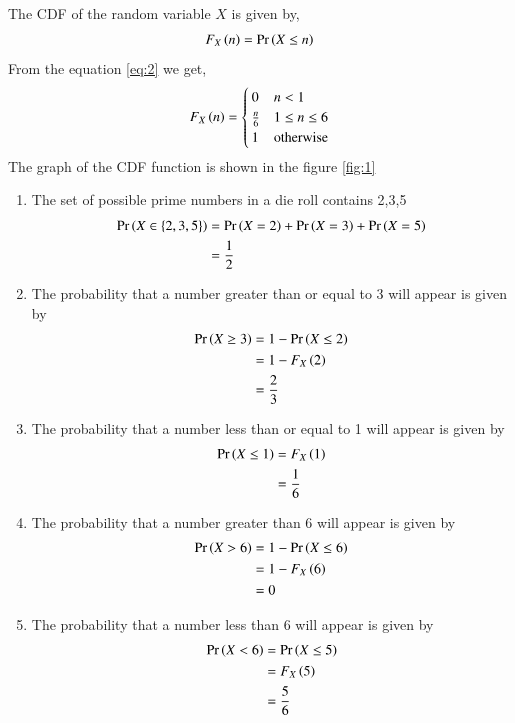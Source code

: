 \documentclass[journal,12pt,twocolumn]{IEEEtran}
\begin{document}
\begin{enumerate}
The CDF of the random variable $X$ is given by,
\begin{align}
F_{X}\left(n\right) = 	\Pr\left(X \le n\right) \label{eq:2}
\end{align}
From the equation \eqref{eq:2} we get,
\begin{align}
F_{X}\left(n\right) = 
\begin{cases}
0 & n < 1 \\
\frac{n}{6} & 1 \le n \leq 6 \\
1 & \text{otherwise}
\end{cases}
\end{align}
The graph of the CDF function is shown in the figure \ref{fig:1}
\begin{enumerate}
\item The set of possible prime numbers in a die roll contains 2,3,5
\begin{align} 
\Pr\left(X \in \{2,3,5\}\right) &= \Pr\left(X = 2\right) + \Pr\left(X = 3\right) + \Pr\left(X = 5\right)\\
&= \frac{1}{2}
\end{align}
\item The probability that a number greater than or equal to 3 will appear is given by
\begin{align}
\Pr\left(X \geq 3\right) &= 1 - \Pr\left(X \leq 2\right)\\
&= 1 - F_{X}\left(2\right)\\
&= \frac{2}{3}
\end{align}
\item The probability that a number less than or equal to 1 will appear is given by
\begin{align}
\Pr\left(X \leq 1\right) &= F_{X}\left(1\right)\\
&= \frac{1}{6}
\end{align}
\item The probability that a number greater than 6 will appear is given by
\begin{align}
\Pr\left(X > 6\right) &= 1 - \Pr\left(X \leq 6\right)\\
&= 1 - F_{X}\left(6\right)\\
&= 0
\end{align}
\item The probability that a number less than 6 will appear is given by
\begin{align}
\Pr\left(X < 6\right) &= \Pr\left(X \leq 5\right)\\
&= F_{X}\left(5\right)\\
&= \frac{5}{6}
\end{align}
\end{enumerate}
\end{enumerate}
\end{document}
